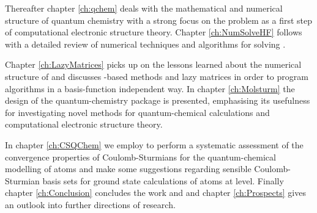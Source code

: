Thereafter chapter \ref{ch:qchem}
deals with the mathematical and numerical structure of quantum chemistry
with a strong focus on the \HF problem
as a first step of computational electronic structure theory.
Chapter \ref{ch:NumSolveHF}
follows with a detailed review of numerical techniques and \SCF algorithms
for solving \HF.

Chapter \ref{ch:LazyMatrices}
picks up on the lessons learned about the numerical structure
of \HF and discusses
\contraction-based methods and lazy matrices
in order to program algorithms
in a basis-function independent way.
In chapter \ref{ch:Molsturm} the design of the quantum-chemistry
package \molsturm is presented,
emphasising its usefulness for investigating novel methods
for quantum-chemical calculations
and computational electronic structure theory.

In chapter \ref{ch:CSQChem} we employ \molsturm
to perform a systematic assessment of
the convergence properties of Coulomb-Sturmians
for the quantum-chemical modelling of atoms
and make some suggestions regarding
sensible Coulomb-Sturmian basis sets for ground state calculations of atoms
at \HF level.
Finally chapter \ref{ch:Conclusion} concludes the work and
and chapter \ref{ch:Prospects} gives
an outlook into further directions of research.
